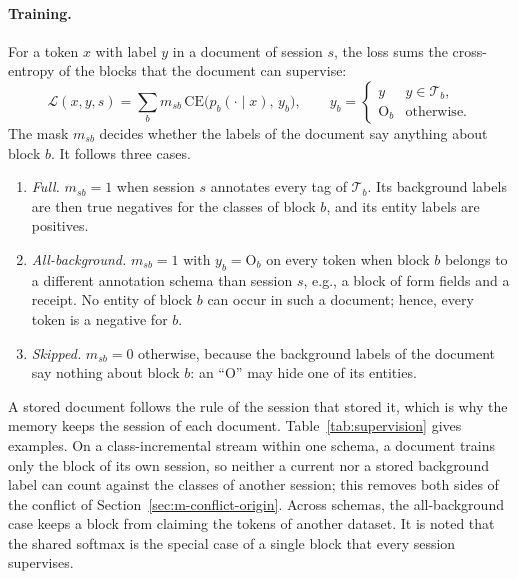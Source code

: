 \paragraph{Training.} For a token $x$ with label $y$ in a document of session $s$, the loss
sums the cross-entropy of the blocks that the document can supervise:
\begin{equation}
  \mathcal{L}(x,y,s)=\sum_{b}m_{sb}\,\mathrm{CE}\big(p_b(\cdot\mid x),\,y_b\big),\qquad
  y_b=\begin{cases} y & y\in\mathcal{T}_b,\\ \mathrm{O}_b & \text{otherwise.}\end{cases}
  \label{eq:sbr}
\end{equation}
The mask $m_{sb}$ decides whether the labels of the document say anything about block $b$.
It follows three cases.
\begin{enumerate}
  \item \emph{Full.} $m_{sb}=1$ when session $s$ annotates every tag of $\mathcal{T}_b$. Its
        background labels are then true negatives for the classes of block $b$, and its
        entity labels are positives.
  \item \emph{All-background.} $m_{sb}=1$ with $y_b=\mathrm{O}_b$ on every token when block
        $b$ belongs to a different annotation schema than session $s$, e.g., a block of form
        fields and a receipt. No entity of block $b$ can occur in such a document; hence,
        every token is a negative for $b$.
  \item \emph{Skipped.} $m_{sb}=0$ otherwise, because the background labels of the document
        say nothing about block $b$: an ``O'' may hide one of its entities.
\end{enumerate}
A stored document follows the rule of the session that stored it, which is why the memory
keeps the session of each document. Table~\ref{tab:supervision} gives examples. On a
class-incremental stream within one schema, a document trains only the block of its own
session, so neither a current nor a stored background label can count against the classes of
another session; this removes both sides of the conflict of
Section~\ref{sec:m-conflict-origin}. Across schemas, the all-background case keeps a block
from claiming the tokens of another dataset. It is noted that the shared softmax is the
special case of a single block that every session supervises.

